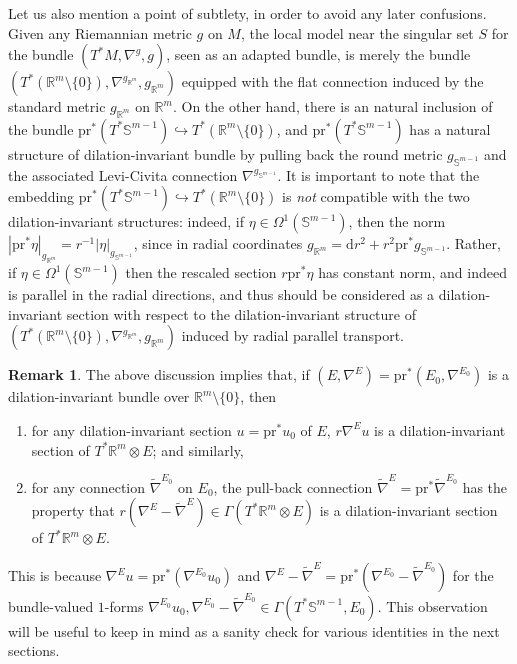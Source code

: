 \documentclass{article}
\numberwithin{equation}{section}        %
\theoremstyle{bfnote}
\theoremstyle{definition}
\theoremstyle{bfremark}
\newtheorem{rem}[thm]{Remark}               %
\newcommand{\R}{\mathbb{R}}                 %
\newcommand{\Sp}{\mathbb{S}}                %
\newcommand{\pr}{\mathrm{pr}}               %
\newcommand{\diff}{\mathrm{d}}                      %
\begin{document}
Let us also mention a point of subtlety, in order to avoid any later confusions. Given any Riemannian metric $g$ on $M$, the local model near the singular set $S$ for the bundle $(T^*M,\nabla^g,g)$, seen as an adapted bundle, is merely the bundle $(T^*(\R^m \setminus \{0\}),\nabla^{g_{\R^m}},g_{\R^m})$ equipped with the flat connection induced by the standard metric $g_{\R^m}$ on $\R^m$. On the other hand, there is an natural inclusion of the bundle $\pr^* (T^* \Sp^{m-1}) \hookrightarrow T^*(\R^m \setminus \{0\})$, and $\pr^*(T^* \Sp^{m-1})$ has a natural structure of dilation-invariant bundle by pulling back the round metric $g_{\Sp^{m-1}}$ and the associated Levi-Civita connection $\nabla^{g_{\Sp^{m-1}}}$. It is important to note that the embedding $\pr^* (T^* \Sp^{m-1}) \hookrightarrow T^*(\R^m \setminus \{0\})$ is \emph{not} compatible with the two dilation-invariant structures: indeed, if $\eta \in \Omega^1(\Sp^{m-1})$, then the norm $|\pr^* \eta|_{g_{\R^m}} = r^{-1} |\eta|_{g_{\Sp^{m-1}}}$, since in radial coordinates $g_{\R^m} = \diff r^2 + r^2 \pr^*g_{\Sp^{m-1}}$. Rather, if $\eta \in \Omega^1(\Sp^{m-1})$ then the rescaled section $r\pr^* \eta$ has constant norm, and indeed is parallel in the radial directions, and thus should be considered as a dilation-invariant section with respect to the dilation-invariant structure of $(T^*(\R^m \setminus \{0\}),\nabla^{g_{\R^m}},g_{\R^m})$ induced by radial parallel transport.

\begin{rem}     \label{rem: Factors of r}
    The above discussion implies that, if $(E,\nabla^E) = \pr^* (E_0,\nabla^{E_0})$ is a dilation-invariant bundle over $\R^m \setminus \{0\}$, then
    \begin{enumerate}
        \item for any dilation-invariant section $u = \pr^* u_0$ of $E$, $r \nabla^E u$ is a dilation-invariant section of $T^*\R^m \otimes E$; and similarly,
        \item for any connection $\tilde{\nabla}^{E_0}$ on $E_0$, the pull-back connection $\widetilde{\nabla}^{E} = \pr^* \widetilde{\nabla}^{E_0}$ has the property that $r (\nabla^{E}-\widetilde{\nabla}^{E}) \in \Gamma(T^*\R^m \otimes E)$ is a dilation-invariant section of $T^* \R^m \otimes E$.
    \end{enumerate}
    This is because $\nabla^E u = \pr^*(\nabla^{E_0} u_0)$ and $\nabla^{E}-\widetilde{\nabla}^{E} = \pr^*(\nabla^{E_0}-\widetilde{\nabla}^{E_0})$ for the bundle-valued $1$-forms $\nabla^{E_0} u_0, \nabla^{E_0}-\widetilde{\nabla}^{E_0} \in \Gamma(T^* \Sp^{m-1},E_0)$. This observation will be useful to keep in mind as a sanity check for various identities in the next sections.
\end{rem}
\end{document}
